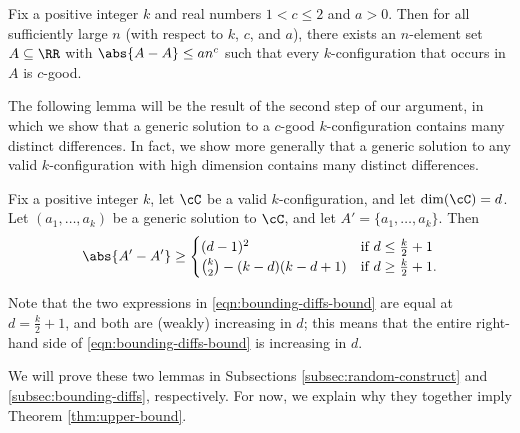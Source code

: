 \begin{lemma} \label{lem:random-construct}
    Fix a positive integer $k$ and real numbers $1 < c \leq 2$ and $a > 0$. Then for all sufficiently large $n$ (with respect to $k$, $c$, and $a$), there exists an $n$-element set $A \subseteq \RR$ with $\abs{A - A} \leq an^c$ such that every $k$-configuration that occurs in $A$ is $c$-good. 
\end{lemma}

The following lemma will be the result of the second step of our argument, in which we show that a generic solution to a $c$-good $k$-configuration contains many distinct differences. In fact, we show more generally that a generic solution to any valid $k$-configuration with high dimension contains many distinct differences. 

\begin{lemma} \label{lem:bounding-diffs}
    Fix a positive integer $k$, let $\cC$ be a valid $k$-configuration, and let $\dim(\cC) = d$. Let $(a_1, \ldots, a_k)$ be a generic solution to $\cC$, and let $A' = \{a_1, \ldots, a_k\}$. Then 
    \begin{align} 
        \abs{A' - A'} \geq \begin{cases} (d - 1)^2 & \text{if $d \leq \frac{k}{2} + 1$} \\ \binom{k}{2} - (k - d)(k - d + 1) & \text{if $d \geq \frac{k}{2} + 1$}.\end{cases} \label{eqn:bounding-diffs-bound}
    \end{align}
\end{lemma}

Note that the two expressions in \eqref{eqn:bounding-diffs-bound} are equal at $d = \frac{k}{2} + 1$, and both are (weakly) increasing in $d$; this means that the entire right-hand side of \eqref{eqn:bounding-diffs-bound} is increasing in $d$. 

We will prove these two lemmas in Subsections \ref{subsec:random-construct} and \ref{subsec:bounding-diffs}, respectively. For now, we explain why they together imply Theorem \ref{thm:upper-bound}. 

